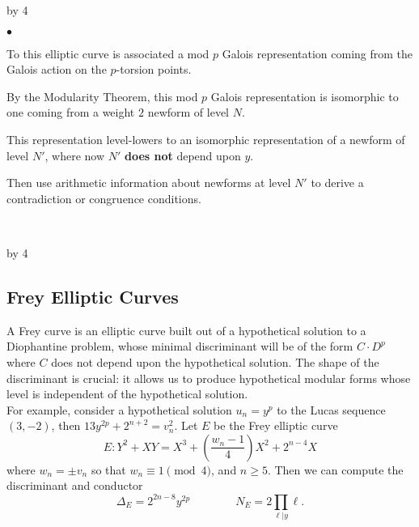 \documentclass[12pt]{scrartcl}
\newenvironment{citemize}{
\begin{list}{$\bullet$}{\setlength{\itemsep}{0pt} \setlength{\rightmargin}{0pt} \setlength{\leftmargin}{0.5\labelwidth} \setlength{\topsep}{0pt}}
}{\end{list}}
\def\anzspalten{4}
\newlength{\kastenwidth}
\newenvironment{kasten}{%
  \begin{lrbox}{\dummybox}%
    \begin{minipage}{0.96\linewidth}}%
    {\end{minipage}%
  \end{lrbox}%
  \raisebox{-\depth}{\psshadowbox[framesep=1em]{\usebox{\dummybox}}}\\[0.5em]}
\newenvironment{spalte}{%
  \setlength\kastenwidth{1.2\textwidth}
  \divide\kastenwidth by \anzspalten
  \begin{minipage}[t]{\kastenwidth}}{\end{minipage}\hfill}
\renewcommand{\emph}[1]{{\color{red}\textbf{#1}}}
\begin{document}
\begin{lrbox}{\spalten}
{\begin{spalte}
\begin{kasten}
\begin{citemize}
\item To this elliptic curve is associated a mod $p$ Galois representation coming from the Galois action on the $p$-torsion points.

\item By the Modularity Theorem, this mod $p$ Galois representation is isomorphic to one coming from a weight $2$ newform of level $N$.

\item This representation level-lowers to an isomorphic representation of a newform of level $N'$, where now $N'$ \emph{does not} depend upon $y$.

\item Then use arithmetic information about newforms at level $N'$ to derive a contradiction or congruence conditions.

\end{citemize}

\end{kasten}



\end{spalte}
    \begin{spalte}


\begin{kasten}

\subsection*{\color{blue} Frey Elliptic Curves}

A Frey curve is an elliptic curve built out of a hypothetical solution to a Diophantine problem, whose minimal discriminant will be of the form $C\cdot D^p$ where $C$ does not depend upon the hypothetical solution. The shape of the discriminant is crucial: it allows us to produce hypothetical modular forms whose level is independent of the hypothetical solution.\\

For example, consider a hypothetical solution $u_n = y^p$ to the Lucas sequence $(3,-2)$, then $13y^{2p} + 2^{n+2} = v_n^2$.
Let $E$ be the Frey elliptic curve
\[ E: Y^2 + XY = X^3 + \left(\frac{w_n-1}{4} \right)X^2 + 2^{n-4}X \]
where $w_n = \pm v_n$ so that $w_n \equiv 1 \pmod{4}$, and $n \geq 5$.  Then we can compute the discriminant and conductor
\[ \Delta_E = 2^{2n-8}y^{2p} \qquad \qquad N_E = 2 \prod_{\ell | y} \ell. \]


\end{kasten}
\end{spalte}}
\end{lrbox}
\end{document}
